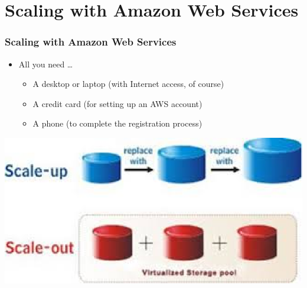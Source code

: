 \documentclass{beamer}
\begin{document}
\section{Scaling with Amazon Web Services}
\begin{frame}[fragile]
\frametitle{Scaling with Amazon Web Services}
\begin{itemize}
 \item All you need \dots
 \begin{itemize}
   \item A desktop or laptop (with Internet access, of course)
   \item A credit card (for setting up an AWS account)
   \item A phone (to complete the registration process)
 \end{itemize}
\end{itemize}
\begin{center}
\includegraphics[scale=0.6]{scale.eps}
\end{center}
\end{frame}
\end{document}
